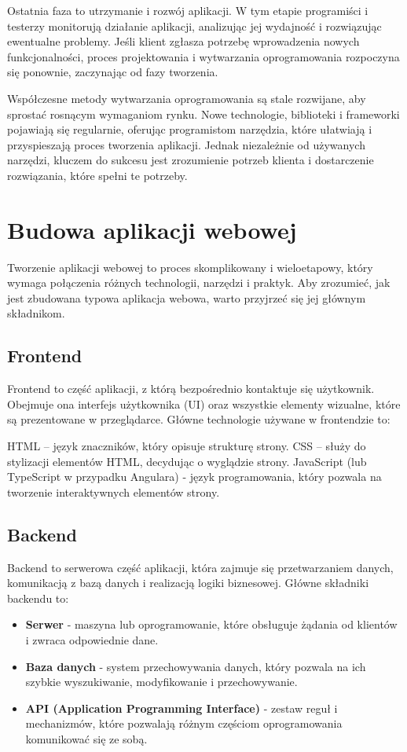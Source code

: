 Ostatnia faza to utrzymanie i rozwój aplikacji. W tym etapie programiści i testerzy monitorują działanie aplikacji, analizując jej wydajność i rozwiązując ewentualne problemy. Jeśli klient zgłasza potrzebę wprowadzenia nowych funkcjonalności, proces projektowania i wytwarzania oprogramowania rozpoczyna się ponownie, zaczynając od fazy tworzenia.

Współczesne metody wytwarzania oprogramowania są stale rozwijane, aby sprostać rosnącym wymaganiom rynku. Nowe technologie, biblioteki i frameworki pojawiają się regularnie, oferując programistom narzędzia, które ułatwiają i przyspieszają proces tworzenia aplikacji. Jednak niezależnie od używanych narzędzi, kluczem do sukcesu jest zrozumienie potrzeb klienta i dostarczenie rozwiązania, które spełni te potrzeby.


\section{Budowa aplikacji webowej}

Tworzenie aplikacji webowej to proces skomplikowany i wieloetapowy, który wymaga połączenia różnych technologii, narzędzi i praktyk. Aby zrozumieć, jak jest zbudowana typowa aplikacja webowa, warto przyjrzeć się jej głównym składnikom.

\subsection{Frontend}

Frontend to część aplikacji, z którą bezpośrednio kontaktuje się użytkownik. Obejmuje ona interfejs użytkownika (UI) oraz wszystkie elementy wizualne, które są prezentowane w przeglądarce. Główne technologie używane w frontendzie to:

HTML -- język znaczników, który opisuje strukturę strony.
CSS -- służy do stylizacji elementów HTML, decydując o wyglądzie strony.
JavaScript (lub TypeScript w przypadku Angulara) - język programowania, który pozwala na tworzenie interaktywnych elementów strony.

\subsection{Backend}

Backend to serwerowa część aplikacji, która zajmuje się przetwarzaniem danych, komunikacją z bazą danych i realizacją logiki biznesowej. Główne składniki backendu to:

\begin{itemize}
\item \textbf{Serwer} - maszyna lub oprogramowanie, które obsługuje żądania od klientów i zwraca odpowiednie dane.
\item \textbf{Baza danych} - system przechowywania danych, który pozwala na ich szybkie wyszukiwanie, modyfikowanie i przechowywanie.
\item \textbf{API (Application Programming Interface)} - zestaw reguł i mechanizmów, które pozwalają różnym częściom oprogramowania komunikować się ze sobą.
\end{itemize}


